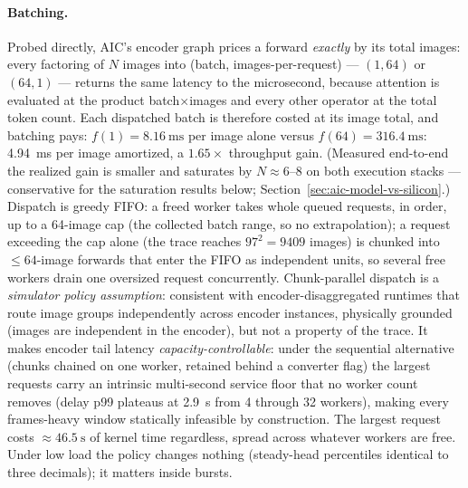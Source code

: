 \paragraph{Batching.} Probed directly, AIC's encoder graph prices a
forward \emph{exactly} by its total images:
every factoring of $N$ images into (batch, images-per-request) --- $(1,64)$
or $(64,1)$ --- returns the same latency to the microsecond, because
attention is evaluated at the product batch$\times$images and every other
operator at the total token count. Each dispatched batch is therefore
costed at its image total, and batching pays: $f(1) = \SI{8.16}{\milli\second}$
per image alone versus $f(64) = \SI{316.4}{\milli\second}$:
\SI{4.94}{\milli\second} per image amortized, a $1.65\times$ throughput
gain. (Measured end-to-end the realized gain is smaller and saturates by
$N{\approx}6$--$8$ on both execution stacks --- conservative for the
saturation results below; Section~\ref{sec:aic-model-vs-silicon}.)
Dispatch is greedy FIFO: a freed worker takes
whole queued requests, in order, up to a 64-image cap (the collected batch
range, so no extrapolation); a request exceeding the cap alone (the
trace reaches $97^2 = \num{9409}$ images) is chunked into $\leq
64$-image forwards that enter the FIFO as independent units, so
several free workers drain one oversized request concurrently.
Chunk-parallel dispatch is a \emph{simulator policy assumption}:
consistent with encoder-disaggregated runtimes that route image groups
independently across encoder instances, physically grounded (images are
independent in the encoder), but not a property of the trace. It makes
encoder tail latency \emph{capacity-controllable}: under the sequential
alternative (chunks chained on one worker, retained behind a converter flag)
the largest requests carry an intrinsic multi-second service floor that no
worker count removes (delay p99 plateaus at \SI{2.9}{\second} from 4 through
32 workers), making every frames-heavy window statically infeasible by
construction. The largest request costs ${\approx}\SI{46.5}{\second}$ of
kernel time regardless, spread across whatever workers are free. Under low load the policy
changes nothing (steady-head percentiles identical to three decimals);
it matters inside bursts.

